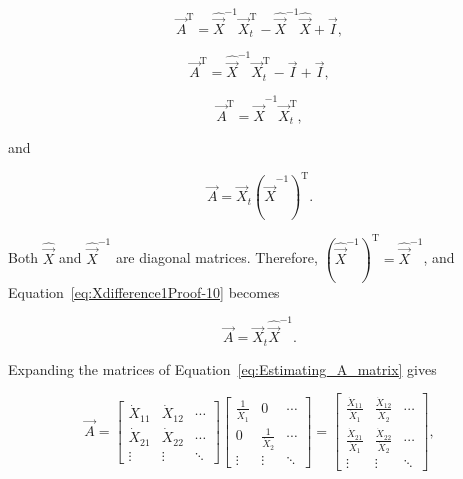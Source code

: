 \begin{equation}\label{eq:Xdifference1Proof-7}
	\vec{A}^\mathrm{T} 
	= \hat{\vec{X}}^{-1} \vec{X}_{t}^\mathrm{T} 
	- \hat{\vec{X}}^{-1} \hat{\vec{X}}
	+ \vec{I},	
\end{equation}

\begin{equation}\label{eq:Xdifference1Proof-8}
	\vec{A}^\mathrm{T} 
	= \hat{\vec{X}}^{-1} \vec{X}_{t}^\mathrm{T} 
	- \vec{I}
	+ \vec{I},	
\end{equation}

\begin{equation}\label{eq:Xdifference1Proof-9}
	\vec{A}^\mathrm{T} 
	= \hat{\vec{X}}^{-1} 
	\vec{X}_{t}^\mathrm{T},
\end{equation}

\noindent{}and

\begin{equation}\label{eq:Xdifference1Proof-10}
	\vec{A} 
	= \vec{X}_{t}
	{\left( {\hat{\vec{X}}^{-1}} \right)}^\mathrm{T}.
\end{equation}

\noindent{}Both $\hat{\vec{X}}$ and $\hat{\vec{X}}^{-1}$
are diagonal matrices. Therefore, 
${\left( \hat{\vec{X}}^{-1} \right)}^{\mathrm{T}} = \hat{\vec{X}}^{-1}$, 
and Equation~\ref{eq:Xdifference1Proof-10} becomes

\begin{equation}\label{eq:Estimating_A_matrix} 
	\vec{A} 
	= \vec{X}_{t}
	\hat{\vec{X}}^{-1}.
\end{equation}

\noindent{}Expanding the matrices of Equation~\ref{eq:Estimating_A_matrix} gives

\begin{equation}
	\vec{A}
	=
	\begin{bmatrix}
		\dot{X}_{11} & \dot{X}_{12} & \cdots \\
		\dot{X}_{21} & \dot{X}_{22} & \cdots \\
		\vdots       & \vdots       & \ddots
	\end{bmatrix}
	\begin{bmatrix}
		\frac{1}{\dot{X}_{1}} & 0                     & \cdots \\
		0                     & \frac{1}{\dot{X}_{2}} & \cdots \\
		\vdots                & \vdots                & \ddots
	\end{bmatrix}
	=
	\begin{bmatrix}
		\frac{\dot{X}_{11}}{\dot{X}_{1}} & \frac{\dot{X}_{12}}{\dot{X}_{2}} & \cdots \\
		\frac{\dot{X}_{21}}{\dot{X}_{1}} & \frac{\dot{X}_{22}}{\dot{X}_{2}} & \cdots \\
		\vdots       & \vdots       & \ddots
	\end{bmatrix},
\end{equation}

